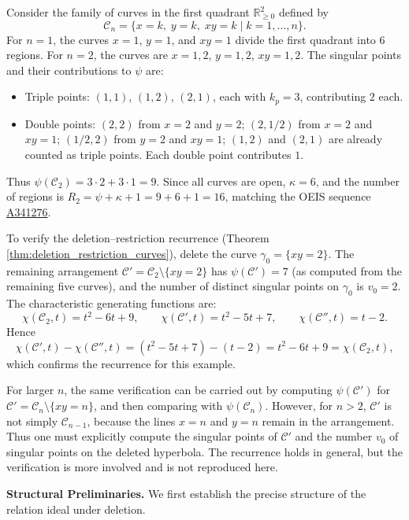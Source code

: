 \documentclass[article,11pt]{amsart} \numberwithin{equation}{section}
\numberwithin{equation}{section}
\begin{document}
{\begin{ex}
\label{exexex}	
Consider the family of curves in the first quadrant $\mathbb R^2_{\ge 0}$ defined by
\[
\mathcal C_n = \{x=k,\; y=k,\; xy=k \mid k=1,\dots,n\}.
\]
For $n=1$, the curves $x=1$, $y=1$, and $xy=1$ divide the first quadrant into $6$ regions.
For $n=2$, the curves are $x=1,2$, $y=1,2$, $xy=1,2$. The singular points and their
contributions to $\psi$ are:
\begin{itemize}
	\item Triple points: $(1,1)$, $(1,2)$, $(2,1)$, each with $k_p=3$, contributing $2$ each.
	\item Double points: $(2,2)$ from $x=2$ and $y=2$; $(2,1/2)$ from $x=2$ and $xy=1$;
	$(1/2,2)$ from $y=2$ and $xy=1$; $(1,2)$ and $(2,1)$ are already counted as triple points.
	Each double point contributes $1$.
\end{itemize}
Thus $\psi(\mathcal C_2) = 3\cdot 2 + 3\cdot 1 = 9$. Since all curves are open, $\kappa = 6$,
and the number of regions is $R_2 = \psi + \kappa + 1 = 9 + 6 + 1 = 16$, matching the OEIS
sequence \href{https://oeis.org/search?q=A341276}{A341276}.

To verify the deletion–restriction recurrence (Theorem \ref{thm:deletion_restriction_curves}), delete the curve
$\gamma_0 = \{xy=2\}$. The remaining arrangement $\mathcal C' = \mathcal C_2 \setminus \{xy=2\}$
has $\psi(\mathcal C') = 7$ (as computed from the remaining five curves), and the
number of distinct singular points on $\gamma_0$ is $v_0 = 2$.
The characteristic generating functions are:
\[
\chi(\mathcal C_2,t)=t^2-6t+9,\qquad
\chi(\mathcal C',t)=t^2-5t+7,\qquad
\chi(\mathcal C'',t)=t-2.
\]
Hence
\[
\chi(\mathcal C',t)-\chi(\mathcal C'',t)
=(t^2-5t+7)-(t-2)
=t^2-6t+9
=\chi(\mathcal C_2,t),
\]
which confirms the recurrence for this example.

For larger $n$, the same verification can be carried out by computing
$\psi(\mathcal C')$ for $\mathcal C' = \mathcal C_n \setminus \{xy=n\}$,
and then comparing with $\psi(\mathcal C_n)$. However, for $n>2$,
$\mathcal C'$ is not simply $\mathcal C_{n-1}$, because the lines $x=n$
and $y=n$ remain in the arrangement. Thus one must explicitly compute
the singular points of $\mathcal C'$ and the number $v_0$ of singular
points on the deleted hyperbola. The recurrence holds in general,
but the verification is more involved and is not reproduced here.
\end{ex}

\medskip
\noindent\textbf{Structural Preliminaries.}
We first establish the precise structure of the relation ideal under deletion.

}
\end{document}
